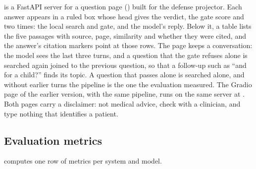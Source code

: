 is a FastAPI server for a question page () built for the defense projector. Each answer appears in a ruled box whose head gives the verdict, the gate score and two times: the local search and gate, and the model's reply. Below it, a table lists the five passages with source, page, similarity and whether they were cited, and the answer's citation markers point at those rows. The page keeps a conversation: the model sees the last three turns, and a question that the gate refuses alone is searched again joined to the previous question, so that a follow-up such as ``and for a child?'' finds its topic. A question that passes alone is searched alone, and without earlier turns the pipeline is the one the evaluation measured. The Gradio page \citep{gradio} of the earlier version, with the same pipeline, runs on the same server at . Both pages carry a disclaimer: not medical advice, check with a clinician, and type nothing that identifies a patient.

\subsection{Evaluation metrics}
\label{sec:metrics}

 computes one row of metrics per system and model.

